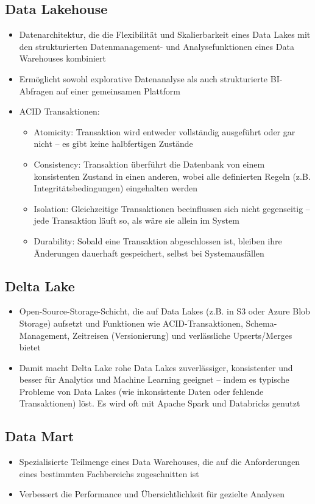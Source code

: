 \documentclass[11pt]{scrartcl}
\begin{document}
\subsection{Data Lakehouse}
\begin{itemize}
	\item Datenarchitektur, die die Flexibilität und Skalierbarkeit eines Data Lakes mit den strukturierten Datenmanagement- und Analysefunktionen eines Data Warehouses kombiniert
	\item Ermöglicht sowohl explorative Datenanalyse als auch strukturierte BI-Abfragen auf einer gemeinsamen Plattform
	\item ACID Transaktionen:
	\begin{itemize}
		\item Atomicity: Transaktion wird entweder vollständig ausgeführt oder gar nicht – es gibt keine halbfertigen Zustände
		\item Consistency: Transaktion überführt die Datenbank von einem konsistenten Zustand in einen anderen, wobei alle definierten Regeln (z.B. Integritätsbedingungen) eingehalten werden
		\item Isolation: Gleichzeitige Transaktionen beeinflussen sich nicht gegenseitig – jede Transaktion läuft so, als wäre sie allein im System
		\item Durability: Sobald eine Transaktion abgeschlossen ist, bleiben ihre Änderungen dauerhaft gespeichert, selbst bei Systemausfällen
	\end{itemize}
\end{itemize}


\subsection{Delta Lake}
\begin{itemize}
	\item Open-Source-Storage-Schicht, die auf Data Lakes (z.B. in S3 oder Azure Blob Storage) aufsetzt und Funktionen wie ACID-Transaktionen, Schema-Management, Zeitreisen (Versionierung) und verlässliche Upserts/Merges bietet
	\item Damit macht Delta Lake rohe Data Lakes zuverlässiger, konsistenter und besser für Analytics und Machine Learning geeignet – indem es typische Probleme von Data Lakes (wie inkonsistente Daten oder fehlende Transaktionen) löst. Es wird oft mit Apache Spark und Databricks genutzt
\end{itemize}	


\subsection{Data Mart}
\begin{itemize}
	\item Spezialisierte Teilmenge eines Data Warehouses, die auf die Anforderungen eines bestimmten Fachbereichs zugeschnitten ist
	\item Verbessert die Performance und Übersichtlichkeit für gezielte Analysen
\end{itemize}
\end{document}
